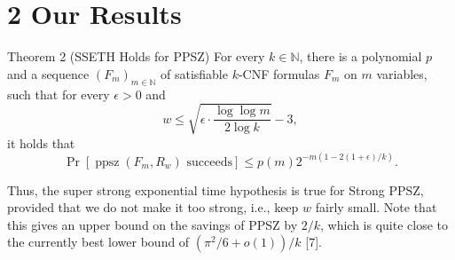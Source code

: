 \section*{2 Our Results}
\begin{authorclaim}{Theorem 2 (SSETH Holds for PPSZ)}
For every $k\in\mathbb N$, there is a polynomial $p$ and a sequence $(F_m)_{m\in\mathbb N}$ of satisfiable $k$-CNF formulas $F_m$ on $m$ variables, such that for every $\epsilon>0$ and
\[
w\le\sqrt{\epsilon\cdot\frac{\log\log m}{2\log k}}-3,
\]
it holds that
\[
\Pr[\operatorname{ppsz}(F_m,R_w)\text{ succeeds}]
\le p(m)2^{-m(1-2(1+\epsilon)/k)}.
\]
\end{authorclaim}
Thus, the super strong exponential time hypothesis is true for Strong PPSZ, provided that we do not make it too strong, i.e., keep $w$ fairly small. Note that this gives an upper bound on the savings of PPSZ by $2/k$, which is quite close to the currently best lower bound of $(\pi^2/6+o(1))/k$ [7].
